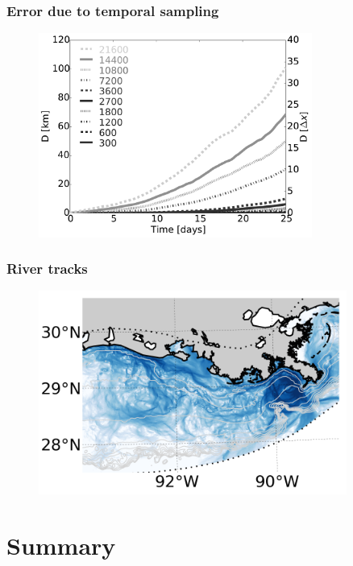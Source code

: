 \documentclass[ignorenonframetext]{beamer}
\begin{document}
\begin{frame}[t]\frametitle{Error due to temporal sampling}
	\begin{figure}[htbp]
		\centering
		\includegraphics[width=0.8\textwidth]{figures/D}
	\end{figure}
\end{frame}

\begin{frame}[t]\frametitle{River tracks}
	\begin{figure}[htbp]
		\centering
		\includegraphics[width=0.9\textwidth]{figures/river_drifter_tracks}
	\end{figure}
\end{frame}

\section{Summary}
\end{document}
